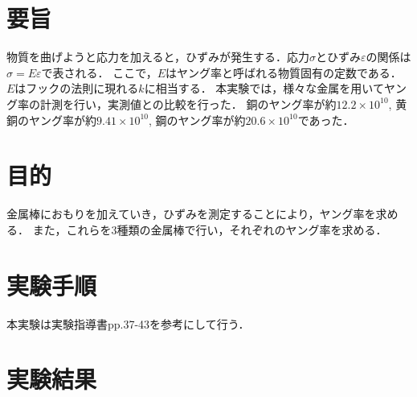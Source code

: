\documentclass[a4paper,11pt]{ltjsarticle}
\begin{document}
\section{要旨}
物質を曲げようと応力を加えると，ひずみが発生する．応力$\sigma$とひずみ$\varepsilon$の関係は$\sigma = E \varepsilon$で表される．
ここで，$E$はヤング率と呼ばれる物質固有の定数である．
$E$はフックの法則に現れる$k$に相当する．
本実験では，様々な金属を用いてヤング率の計測を行い，実測値との比較を行った．
銅のヤング率が約$12.2 \times 10^{10}$,
黄銅のヤング率が約$9.41 \times 10^{10}$,
鋼のヤング率が約$20.6 \times 10^{10}$であった．
\section{目的}
金属棒におもりを加えていき，ひずみを測定することにより，ヤング率を求める．
また，これらを3種類の金属棒で行い，それぞれのヤング率を求める．
\section{実験手順}
本実験は実験指導書pp.37-43を参考にして行う．
\section{実験結果}
\end{document}
